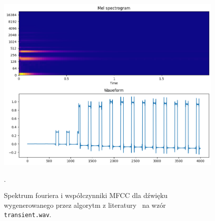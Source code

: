 \begin{multicols}{3}
\begin{figure}[H]
    \centering
    \includegraphics[width=0.9\linewidth]{rys06/macret_evolved_transient.png}
    \caption{
      Spektrum fouriera i współczynniki MFCC dla dźwięku wygenerowanego 
      przez algorytm z literatury~\cite{evolutionary_puredata} na wzór
      \texttt{transient.wav}.
    }\label{fig:evolved_literature_transient_sound_overview}.
\end{figure}
\end{multicols}


